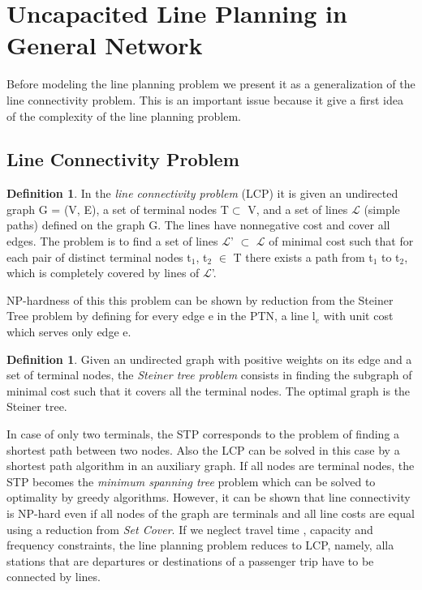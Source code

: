 \documentclass[
  twoside,
  11pt, a4paper,
  footinclude=true,
  headinclude=true,
  cleardoublepage=empty
]{scrbook}
\theoremstyle{definition}
\newtheorem{definition}[theorem]{Definition}
\begin{document}
\section{Uncapacited Line Planning in General Network}
Before modeling the line planning problem we present it as a generalization of the line connectivity problem. This is an important issue because it give a first idea of the complexity of the line planning problem.
\subsection{Line Connectivity Problem}
\begin{definition} In the \emph{line connectivity problem} (LCP) it is given an undirected graph G = (V, E), a set of terminal nodes T$\subset$ V, and a set of lines $\mathcal{L}$ (simple paths) defined on the graph G. The lines have nonnegative cost and cover all edges. The problem is to find a set of lines $\mathcal{L}$' $\subset$ $\mathcal{L}$ of minimal cost such that for each pair of distinct terminal nodes t$_1$, t$_2$ $\in$ T there exists a path from t$_1$ to t$_2$, which is completely covered by lines of $\mathcal{L}$'.
\end{definition} 
NP-hardness of this this problem can be shown by reduction from the Steiner Tree problem by defining for every edge e in the PTN, a line l$_e$ with unit cost which serves only edge e. 
\begin{definition} Given an undirected graph with positive weights on its edge and a set of terminal nodes, the \emph{Steiner tree problem} consists in finding the subgraph of minimal cost such that it covers all the terminal nodes. The optimal graph is the Steiner tree.
\end{definition}
In case of only two terminals, the STP corresponds to the problem of finding a shortest path between two nodes. Also the LCP can be solved in this case by a shortest path algorithm in an auxiliary graph. If all nodes are terminal nodes, the STP becomes the \emph{minimum spanning tree} problem which can be solved  to optimality by greedy algorithms. \newline
However, it can be shown that line connectivity is NP-hard even if all nodes of the graph are terminals and all line costs are equal using a reduction from \emph{Set Cover}.
\newline
If we neglect travel time , capacity and frequency constraints, the line planning problem reduces to LCP, namely, alla stations that are departures or destinations of a passenger trip have to be connected by lines.
\end{document}
